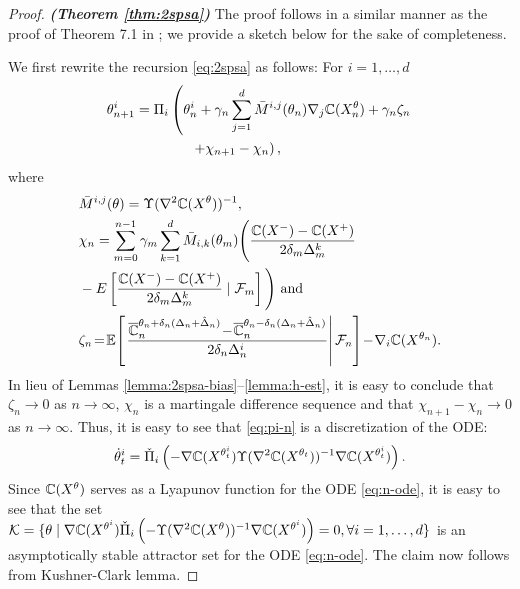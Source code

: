 \begin{proof}\textbf{\textit{(Theorem \ref{thm:2spsa})}}
The proof follows in a similar manner as the proof of Theorem 7.1 in \cite{Bhatnagar13SR}; we provide a sketch below for the sake of completeness.

We first rewrite the recursion \eqref{eq:2spsa} as follows:
For $i=1,\ldots, d$
\begin{align}
 &\theta^{i}_{n+1} = \Pi_{i}\left(\theta^{i}_n + \gamma_n \sum_{j=1}^{d} \bar M^{i,j}(\theta_n) \nabla_{j} \mathbb{C}(X^\theta_n) + \gamma_n \zeta_n \right.\nonumber\\
&\qquad\qquad\qquad\left. + \chi_{n+1} - \chi_n \right), \label{eq:pi-n}
\end{align}
where 
\begin{align*}
&\bar M^{i,j}(\theta) = \Upsilon(\nabla^2 \mathbb{C}(X^{\theta}))^{-1},\\
& \chi_n = \sum_{m=0}^{n-1} \gamma_m \sum_{k=1}^{d} {\bar{M}}_{i,k}(\theta_m)\Bigg(
\frac{\mathbb{C}(X^{-}) -
\mathbb{C}(X^{+})}{2\delta_m \Delta^k_m} 
 \\
 &- E\left[\frac{\mathbb{C}(X^{-}) -
\mathbb{C}(X^{+})}{2\delta_m \Delta^k_m} 
\mid {\cal F}_m\right]\Bigg) \text{ and}\\
&\zeta_n \!=\! \mathbb{E}\!\left[\left.\dfrac{\overline {\mathbb{C}}_n^{\theta_n + \delta_n (\Delta_n + \hat \Delta_n)} \!-\!\overline {\mathbb{C}}_n^{\theta_n - \delta_n (\Delta_n + \hat \Delta_n)}}{2 \delta_n \Delta_n^i}\right| \mathcal{F}_n \right] \!-\! \nabla_i \mathbb{C}(X^{\theta_n}).
\end{align*}
In lieu of Lemmas \ref{lemma:2spsa-bias}--\ref{lemma:h-est}, it is easy to conclude that $\zeta_n \rightarrow 0$ as $n\rightarrow \infty$, $\chi_n$ is a martingale difference sequence and that $\chi_{n+1} - \chi_n \rightarrow 0$ as $n\rightarrow \infty$. 
Thus, it is easy to see that \eqref{eq:pi-n} is a discretization of the ODE:
\begin{align}
\dot\theta^{i}_t = \check\Pi_{i}\left(- \nabla \mathbb{C}(X^{\theta^{i}_t}) \Upsilon(\nabla^2 \mathbb{C}(X^{\theta_t}))^{-1} \nabla \mathbb{C}(X^{\theta^{i}_t}) \right).
\label{eq:n-ode}
\end{align}
Since $\mathbb{C}(X^{\theta})$ serves as a Lyapunov function for the ODE \eqref{eq:n-ode}, it is easy to see that the set \\$\mathcal{K} = \{\theta \mid
\nabla \mathbb{C}(X^{\theta^{i}})  \check\Pi_{i}\left(-\Upsilon(\nabla^2 \mathbb{C}(X^{\theta}))^{-1} \nabla \mathbb{C}(X^{\theta^{i}})\right)
=0, \forall i=1,\ldots,d\}$ is an asymptotically stable attractor set for the ODE \eqref{eq:n-ode}. The claim now follows from Kushner-Clark lemma.
\end{proof}

